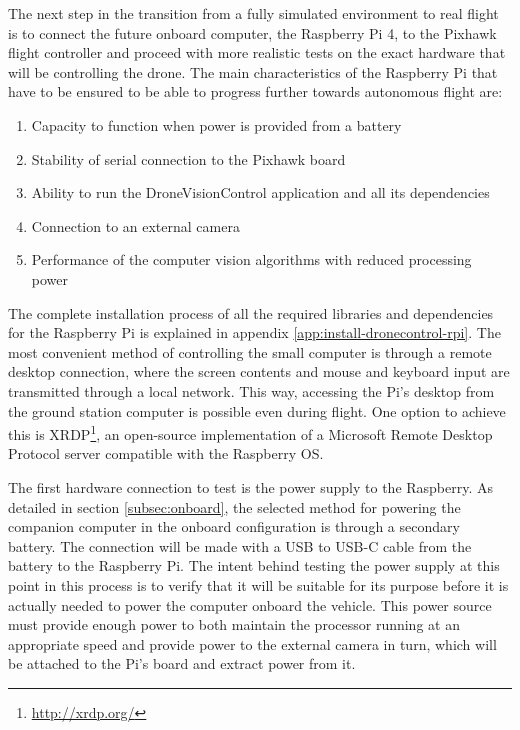The next step in the transition from a fully simulated environment to real flight is to connect the future onboard computer, the Raspberry Pi 4, to the Pixhawk flight controller and proceed with more realistic tests on the exact hardware that will be controlling the drone.
The main characteristics of the Raspberry Pi that have to be ensured to be able to progress further towards autonomous flight are:
\begin{enumerate}
    \item Capacity to function when power is provided from a battery
    \item Stability of serial connection to the Pixhawk board
    \item Ability to run the DroneVisionControl application and all its dependencies
    \item Connection to an external camera
    \item Performance of the computer vision algorithms with reduced processing power
\end{enumerate}


The complete installation process of all the required libraries and dependencies for the Raspberry Pi is explained in appendix \ref{app:install-dronecontrol-rpi}.
The most convenient method of controlling the small computer is through a remote desktop connection, where the screen contents and mouse and keyboard input are transmitted through a local network.
This way, accessing the Pi's desktop from the ground station computer is possible even during flight.
One option to achieve this is XRDP\footnote{\url{http://xrdp.org/}}, an open-source implementation of a Microsoft Remote Desktop Protocol server compatible with the Raspberry OS.

The first hardware connection to test is the power supply to the Raspberry.
As detailed in section \ref{subsec:onboard}, the selected method for powering the companion computer in the onboard configuration is through a secondary battery.
The connection will be made with a USB to USB-C cable from the battery to the Raspberry Pi.
The intent behind testing the power supply at this point in this process is to verify that it will be suitable for its purpose before it is actually needed to power the computer onboard the vehicle.
This power source must provide enough power to both maintain the processor running at an appropriate speed and provide power to the external camera in turn, which will be attached to the Pi's board and extract power from it.

